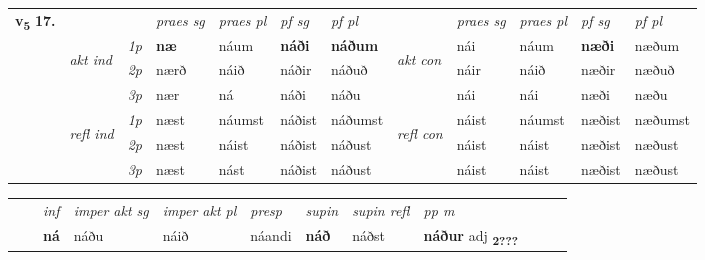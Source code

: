 \begin{tabular}{llllllllllll} \toprule
\multirow{4}{*}{{{\textbf{v{\textsubscript{5}}} \Large{\textbf{17.}}}}}  & &   &  \textit{praes sg}  & \textit{praes pl}  &\textit{ pf sg} & \textit{pf pl} &  &  \textit{praes sg}  & \textit{praes pl}  & \textit{pf sg} & \textit{pf pl } \\*
	\cmidrule{4-7} \cmidrule{9-12}
 & \multirow{3}{*}{\begin{turn}{90}\textit{akt ind}\end{turn}} & {\textit{1p}} & \textbf{næ} & náum    & \textbf{náði} & \textbf{náðum} & \multirow{3}{*}{\begin{turn}{90}\textit{akt con}\end{turn}} &nái & náum & \textbf{næði} & næðum\\*
& &  {\textit{2p}} &  nærð  & náið   & náðir & náðuð & & náir & náið & næðir & næðuð \\*
& &  {\textit{3p}} & nær & ná   & náði & náðu & & nái & nái& næði & næðu  \\*
\cmidrule{4-7} \cmidrule{9-12}
 &\multirow{3}{*}{\begin{turn}{90}\textit{refl ind}\end{turn}} & {\textit{1p}} & næst & náumst    & náðist & náðumst & \multirow{3}{*}{\begin{turn}{90}\textit{refl con}\end{turn}}  &náist & náumst & næðist & næðumst\\*
 &&  {\textit{2p}} &  næst  & náist   & náðist & náðust & &náist & náist & næðist & næðust \\*
& &  {\textit{3p}} & næst & nást   & náðist & náðust & & náist & náist& næðist & næðust  \\*
\cmidrule{4-7} \cmidrule{9-12}
\end{tabular}


\begin{tabular}{llllllllllll}
 & & \textit{inf} & \textit{imper akt sg} & \textit{imper akt pl}   & \textit{presp} & \textit{supin} & \textit{supin refl} & \textit{pp m}     \\*
  & & \textbf{ná} & náðu  & náið   & náandi &  \textbf{náð} & náðst & \textbf{náður} adj \textbf{\textsubscript{2???}} \\*
\cmidrule{1-12}
\end{tabular}




